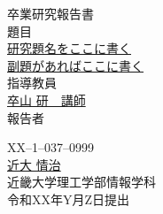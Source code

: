 
\begin{center}
\vspace*{1cm}
\large
{\LARGE 卒業研究報告書}\\
\vspace*{0.8cm}
題目\\
\vspace*{1cm}
{\Huge \underline{研究題名をここに書く}}\\
\vspace{3mm}
{\LARGE \underline{副題があればここに書く}}\\

\vspace*{3cm}
指導教員\\
\vspace*{0.3cm}
\underline{\LARGE 卒山 研　講師}\\
\vspace*{3cm}
報告者\\
\vspace*{0.3cm}

{XX--1--037--0999}\\
\vspace*{0.3cm}
\underline{\Huge 近大 情治}\\
\vspace*{0.5cm}
近畿大学理工学部情報学科\\
\vspace*{2cm}
令和XX年Y月Z日提出\\
\end{center}
 

